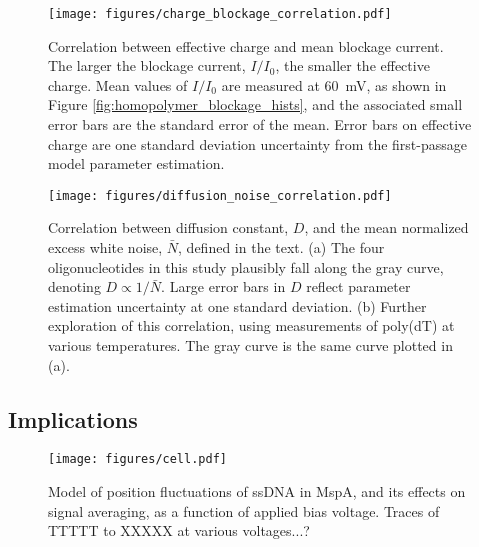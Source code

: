 \begin{figure}[h]
\begin{centering}
\texttt{[image: figures/charge\_blockage\_correlation.pdf]}
\caption[Correlation between effective charge and current]{Correlation between effective charge and mean blockage current.  The larger the blockage current, $I/I_0$, the smaller the effective charge.  Mean values of $I/I_0$ are measured at \SI{60}{\mV}, as shown in Figure \ref{fig:homopolymer_blockage_hists}, and the associated small error bars are the standard error of the mean.  Error bars on effective charge are one standard deviation uncertainty from the first-passage model parameter estimation.}
\label{fig:charge_current_correlation}
\end{centering}
\end{figure}

\begin{figure}[h]
\begin{centering}
\texttt{[image: figures/diffusion\_noise\_correlation.pdf]}
\caption[Correlation between diffusion and noise]{Correlation between diffusion constant, $D$, and the mean normalized excess white noise, $\bar{N}$, defined in the text.  (a) The four oligonucleotides in this study plausibly fall along the gray curve, denoting $D \propto 1/\bar{N}$.  Large error bars in $D$ reflect parameter estimation uncertainty at one standard deviation.  (b) Further exploration of this correlation, using measurements of poly(dT) at various temperatures.  The gray curve is the same curve plotted in (a).}
\label{fig:diffusion_noise_correlation}
\end{centering}
\end{figure}

\subsection{Implications}

\begin{figure}[h]
\begin{centering}
\texttt{[image: figures/cell.pdf]}
\caption[Thermal motion averaging with voltage]{Model of position fluctuations of ssDNA in MspA, and its effects on signal averaging, as a function of applied bias voltage.  Traces of TTTTT to XXXXX at various voltages...?}
\label{fig:thermal_motion_projections}
\end{centering}
\end{figure}
